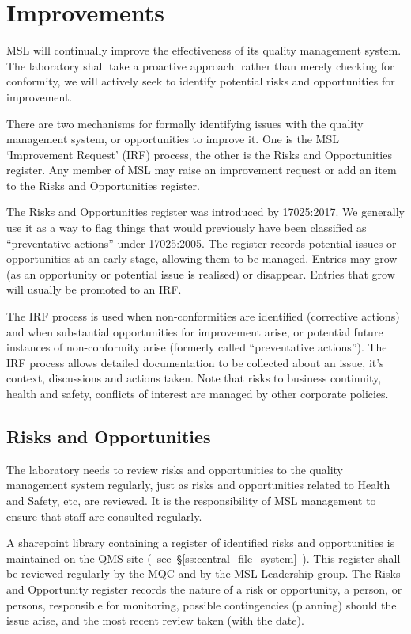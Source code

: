 \section{Improvements}
\label{s:improvements}
MSL will continually improve the effectiveness of its quality management system. The laboratory shall take a proactive approach: rather than merely checking for conformity, we will actively seek to identify potential risks and opportunities for improvement.

There are two mechanisms for formally identifying issues with the quality management system, or opportunities to improve it. One is the MSL ‘Improvement Request’ (IRF) process, the other is the Risks and Opportunities register. 
Any member of MSL may raise an improvement request or add an item to the Risks and Opportunities register. 

The Risks and Opportunities register was introduced by 17025:2017. We generally use it as a way to flag things that would previously have been classified as “preventative actions” under 17025:2005. The register records potential issues or opportunities at an early stage, allowing them to be managed. Entries may grow (as an opportunity or potential issue is realised) or disappear. Entries that grow will usually be promoted to an IRF.

The IRF process is used when non-conformities are identified (corrective actions) and when substantial opportunities for improvement arise, or potential future instances of non-conformity arise (formerly called “preventative actions”). The IRF process allows detailed documentation to be collected about an issue, it’s context, discussions and actions taken. 
Note that risks to business continuity, health and safety, conflicts of interest are managed by other corporate policies. 

\subsection{Risks and Opportunities}
The laboratory needs to review risks and opportunities to the quality management system regularly, just as risks and opportunities related to Health and Safety, etc, are reviewed. It is the responsibility of MSL management to ensure that staff are consulted regularly. 

A sharepoint library containing a register of identified risks and opportunities is maintained on the QMS site (~see~\S\ref{ss:central_file_system}~). This register shall be reviewed regularly by the MQC and by the MSL Leadership group. 
The Risks and Opportunity register records the nature of a risk or opportunity, a person, or persons, responsible for monitoring, possible contingencies (planning) should the issue arise, and the most recent review taken (with the date).

